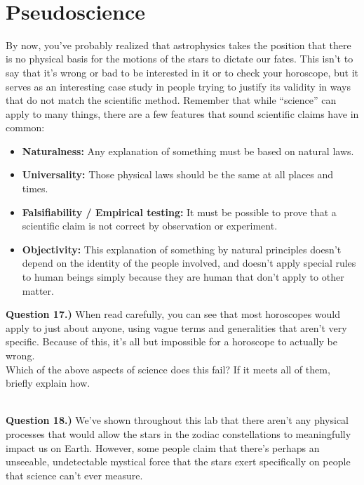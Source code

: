 \documentclass[11pt]{article}
\begin{document}
\vspace{1.5cm}
\hrulefill\\

\section{Pseudoscience}
By now, you've probably realized that astrophysics takes the position that there is no physical basis for the motions of the stars to dictate our fates. This isn't to say that it's wrong or bad to be interested in it or to check your horoscope, but it serves as an interesting case study in people trying to justify its validity in ways that do not match the scientific method. Remember that while ``science'' can apply to many things, there are a few features that sound scientific claims have in common:
\begin{itemize}
	
	\item \textbf{Naturalness:} Any explanation of something must be based on natural laws.\\
	\item \textbf{Universality:} Those physical laws should be the same at all places and times.\\
	\item \textbf{Falsifiability / Empirical testing:} It must be possible to prove that a scientific claim is not correct by observation or experiment.
	\item \textbf{Objectivity:} This explanation of something by natural principles doesn't depend on the identity of the people involved, and doesn't apply special rules to human beings simply because they are human that don't apply to other matter.
\end{itemize}

\textbf{Question 17.)} When read carefully, you can see that most horoscopes would apply to just about anyone, using vague terms and generalities that aren't very specific. Because of this, it's all but impossible for a horoscope to actually be wrong.\\

Which of the above aspects of science does this fail? If it meets all of them, briefly explain how.\\

\vspace{1.5cm}
\hrulefill\\

\newpage

\textbf{Question 18.)} We've shown throughout this lab that there aren't any physical processes that would allow the stars in the zodiac constellations to meaningfully impact us on Earth. However, some people claim that there's perhaps an unseeable, undetectable mystical force that the stars exert specifically on people that science can't ever measure.\\
\end{document}
